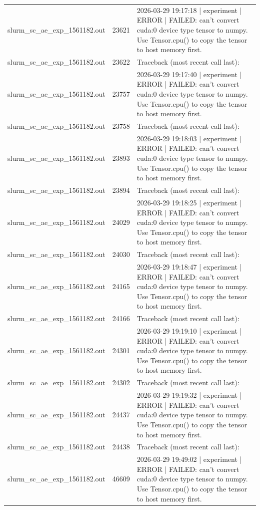 \begin{tabular}{lrl}
slurm\_sc\_ae\_exp\_1561182.out & 23621 & 2026-03-29 19:17:18 | experiment | ERROR |   FAILED: can't convert cuda:0 device type tensor to numpy. Use Tensor.cpu() to copy the tensor to host memory first. \\
slurm\_sc\_ae\_exp\_1561182.out & 23622 & Traceback (most recent call last): \\
slurm\_sc\_ae\_exp\_1561182.out & 23757 & 2026-03-29 19:17:40 | experiment | ERROR |   FAILED: can't convert cuda:0 device type tensor to numpy. Use Tensor.cpu() to copy the tensor to host memory first. \\
slurm\_sc\_ae\_exp\_1561182.out & 23758 & Traceback (most recent call last): \\
slurm\_sc\_ae\_exp\_1561182.out & 23893 & 2026-03-29 19:18:03 | experiment | ERROR |   FAILED: can't convert cuda:0 device type tensor to numpy. Use Tensor.cpu() to copy the tensor to host memory first. \\
slurm\_sc\_ae\_exp\_1561182.out & 23894 & Traceback (most recent call last): \\
slurm\_sc\_ae\_exp\_1561182.out & 24029 & 2026-03-29 19:18:25 | experiment | ERROR |   FAILED: can't convert cuda:0 device type tensor to numpy. Use Tensor.cpu() to copy the tensor to host memory first. \\
slurm\_sc\_ae\_exp\_1561182.out & 24030 & Traceback (most recent call last): \\
slurm\_sc\_ae\_exp\_1561182.out & 24165 & 2026-03-29 19:18:47 | experiment | ERROR |   FAILED: can't convert cuda:0 device type tensor to numpy. Use Tensor.cpu() to copy the tensor to host memory first. \\
slurm\_sc\_ae\_exp\_1561182.out & 24166 & Traceback (most recent call last): \\
slurm\_sc\_ae\_exp\_1561182.out & 24301 & 2026-03-29 19:19:10 | experiment | ERROR |   FAILED: can't convert cuda:0 device type tensor to numpy. Use Tensor.cpu() to copy the tensor to host memory first. \\
slurm\_sc\_ae\_exp\_1561182.out & 24302 & Traceback (most recent call last): \\
slurm\_sc\_ae\_exp\_1561182.out & 24437 & 2026-03-29 19:19:32 | experiment | ERROR |   FAILED: can't convert cuda:0 device type tensor to numpy. Use Tensor.cpu() to copy the tensor to host memory first. \\
slurm\_sc\_ae\_exp\_1561182.out & 24438 & Traceback (most recent call last): \\
slurm\_sc\_ae\_exp\_1561182.out & 46609 & 2026-03-29 19:49:02 | experiment | ERROR |   FAILED: can't convert cuda:0 device type tensor to numpy. Use Tensor.cpu() to copy the tensor to host memory first. \\

\end{tabular}
